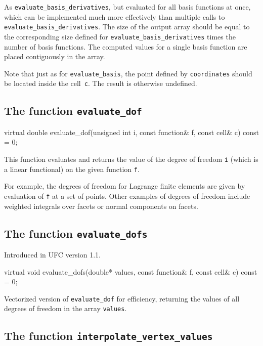 As \texttt{evaluate\_basis\_derivatives}, but evaluated for all
basis functions at once, which can be implemented much more
effectively than multiple calls to \texttt{evaluate\_basis\_derivatives}.
The size of the output array should be equal to the corresponding size
defined for \texttt{evaluate\_basis\_derivatives} times the number of
basis functions. The computed values for a single basis function
are placed contiguously in the array.

Note that just as for \texttt{evaluate\_basis}, the point defined by
\texttt{coordinates} should be located inside the cell~\texttt{c}. The
result is otherwise undefined.

\subsection{The function \texttt{evaluate\_dof}}

\begin{code}
virtual double evaluate_dof(unsigned int i,
                            const function& f,
                            const cell& c) const = 0;
\end{code}

This function evaluates and returns the value of the degree of freedom
\texttt{i} (which is a linear functional) on the given function
\texttt{f}.

For example, the degrees of freedom for Lagrange finite elements are
given by evaluation of \texttt{f} at a set of points. Other examples
of degrees of freedom include weighted integrals over facets or normal
components on facets.

\subsection{The function \texttt{evaluate\_dofs}}
Introduced in UFC version 1.1.

\begin{code}
virtual void evaluate_dofs(double* values,
                           const function& f,
                           const cell& c) const = 0;
\end{code}

Vectorized version of \texttt{evaluate\_dof} for efficiency,
returning the values of all degrees of freedom in the array \texttt{values}.

\subsection{The function \texttt{interpolate\_vertex\_values}}

